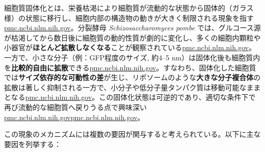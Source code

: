 細胞質固体化とは、栄養枯渇により細胞質が流動的な状態から固体的（ガラス様）の状態に移行し、細胞内部の構造物の動きが大きく制限される現象を指す\href{https://pmc.ncbi.nlm.nih.gov/articles/PMC6857596/\#:~:text=run\%20out\%20of\%20nutrients,2016\%20\%3B\%20\%2043}{pmc.ncbi.nlm.nih.gov}。分裂酵母 \textit{Schizosaccharomyces pombe} では、グルコース源が枯渇してから数日後に細胞質の動的性質が劇的に変化し、多くの細胞内顆粒や小器官が\textbf{ほとんど拡散しなくなる}ことが観察されている\href{https://pmc.ncbi.nlm.nih.gov/articles/PMC6857596/\#:~:text=run\%20out\%20of\%20nutrients,2016\%20\%3B\%20\%2043}{pmc.ncbi.nlm.nih.gov}。一方で、小さな分子（例：GFP程度のサイズ, 約4–5 nm）は固体化後も細胞質内を\textbf{比較的自由に拡散}できる\href{https://pmc.ncbi.nlm.nih.gov/articles/PMC6857596/\#:~:text=run\%20out\%20of\%20nutrients,2016\%20\%3B\%20\%2043}{pmc.ncbi.nlm.nih.gov}。すなわち、固体化した細胞質では\textbf{サイズ依存的な可動性の差}が生じ、リボソームのような\textbf{大きな分子複合体}の拡散は著しく抑制される一方で、小分子や低分子量タンパク質は移動可能なままとなる\href{https://pmc.ncbi.nlm.nih.gov/articles/PMC11214080/\#:~:text=spores\%20and\%20uncovered\%20signaling\%20pathways,such\%20as\%20ribosomes\%2C\%20is\%20restricted}{pmc.ncbi.nlm.nih.gov}。この固体化状態は可逆的であり、適切な条件下で再び流動的な細胞質へ戻りうる点で興味深い\href{https://pmc.ncbi.nlm.nih.gov/articles/PMC6857596/\#:~:text=Cells\%20depend\%20on\%20a\%20highly,dependent\%20manner.\%20We}{pmc.ncbi.nlm.nih.gov}\href{https://pmc.ncbi.nlm.nih.gov/articles/PMC6857596/\#:~:text=provide\%20experimental\%20evidence\%20that\%2C\%20in,cellular\%20architecture\%20in\%20dormant\%20cells}{pmc.ncbi.nlm.nih.gov}。

この現象のメカニズムには複数の要因が関与すると考えられている。以下に主な要因を列挙する：

